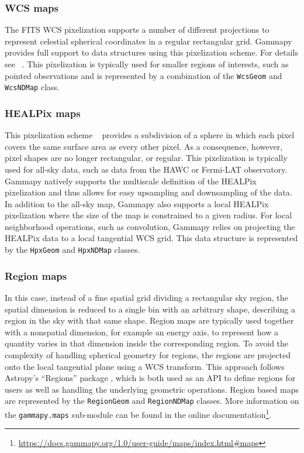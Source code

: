 \documentclass[longauth]{aa}
\newcommand{\code}[1]{\texttt{#1}}
\newcommand{\gammapy}{Gammapy\xspace}
\newcommand{\hawc}{HAWC\xspace}
\newcommand{\fermi}{Fermi-LAT\xspace}
\begin{document}
\subsubsection{WCS maps}
The FITS WCS pixelization supports a number of different projections to
represent celestial spherical coordinates in a regular rectangular grid.
\gammapy provides full support to data structures using this pixelization
scheme. For details see ~\cite{Calabretta2002}. This pixelization
is typically used for smaller regions of interests, such as pointed
observations and is represented by a combination of the
\code{WcsGeom} and \code{WcsNDMap} class.


\subsubsection{HEALPix maps}
This pixelization scheme ~\citep{Calabretta2002, Gorski2005} provides a
subdivision of a sphere in which each pixel covers the same surface area as
every other pixel. As a consequence, however, pixel shapes are no longer
rectangular, or regular.
This pixelization is typically used for all-sky data, such as data
from the \hawc or \fermi observatory. \gammapy natively supports
the multiscale definition of the HEALPix pixelization and thus
allows for easy upsampling and downsampling of the data. In addition to
the all-sky map, \gammapy also supports a local HEALPix
pixelization where the size of the map is constrained to a given
radius.
For local neighborhood operations, such as convolution, \gammapy relies
on projecting the HEALPix data to a local tangential WCS grid.
This data structure is represented by the \code{HpxGeom} and \code{HpxNDMap}
classes. 


\subsubsection{Region maps}
In this case, instead of a fine spatial grid
dividing a rectangular sky region, the spatial dimension is reduced to a single
bin with an arbitrary shape, describing a region in the sky with that same
shape. Region maps are typically used together with a nonspatial dimension, for
example an energy axis, to represent how a quantity varies in that dimension
inside the corresponding region. To avoid the complexity of handling
spherical geometry for regions, the regions are projected onto the local
tangential plane using a WCS transform. This approach follows Astropy's \enquote{Regions}
package \citep{AstropyRegions2022}, which is both used as an API to define regions
for users as well as handling the underlying geometric operations. Region based
maps are represented by the \code{RegionGeom} and \code{RegionNDMap} classes.
More information on the \code{gammapy.maps} sub-module can be found 
in the online documentation\footnote{\url{https://docs.gammapy.org/1.0/user-guide/maps/index.html\#maps}}.
\end{document}
